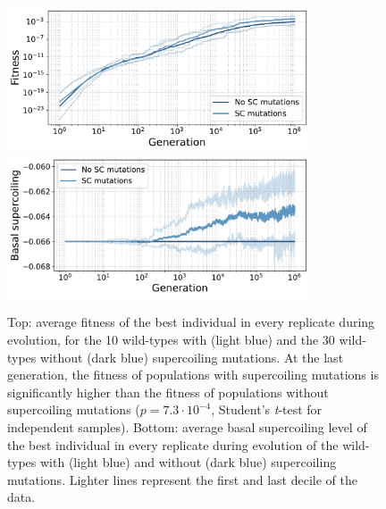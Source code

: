 \begin{figure}
\centering
\includegraphics[width=0.8\textwidth]{epistasis/img/wt-with-sc/fitness_all_with_main.pdf}
\includegraphics[width=0.8\textwidth]{epistasis/img/wt-with-sc/basal_sc_all.pdf}
\caption[Average basal supercoiling and fitness during evolution of the wild-types, with basal supercoiling level mutations]{Top: average fitness of the best individual in every replicate during evolution, for the 10 wild-types with (light blue) and the 30 wild-types without (dark blue) supercoiling mutations.
At the last generation, the fitness of populations with supercoiling mutations is significantly higher than the fitness of populations without supercoiling mutations ($p = 7.3\cdot10^{-4}$, Student's \emph{t}-test for independent samples).
Bottom: average basal supercoiling level of the best individual in every replicate during evolution of the wild-types with (light blue) and without (dark blue) supercoiling mutations.
Lighter lines represent the first and last decile of the data.}
\label{fig:epistasis:wt-evolution}
\end{figure}

